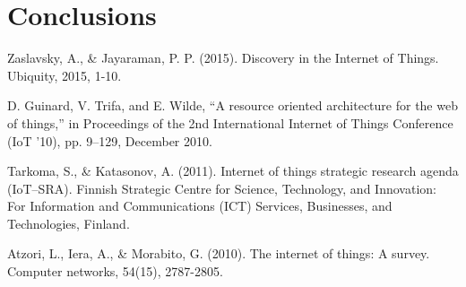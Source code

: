 \documentclass[conference]{IEEEtran}
\begin{document}
\section{Conclusions  }



\begin{thebibliography}{00}
	
	Zaslavsky, A., \& Jayaraman, P. P. (2015). Discovery in the Internet of Things. Ubiquity, 2015, 1-10.
	
 
 D. Guinard, V. Trifa, and E. Wilde, “A resource oriented architecture for the web of things,” in Proceedings of the 2nd International Internet of Things Conference (IoT ’10), pp. 9–129,
 December 2010.
 
 Tarkoma, S., \& Katasonov, A. (2011). Internet of things strategic research agenda (IoT–SRA). Finnish Strategic Centre for Science, Technology, and Innovation: For Information and Communications (ICT) Services, Businesses, and Technologies, Finland.
 
 Atzori, L., Iera, A., \& Morabito, G. (2010). The internet of things: A survey. Computer networks, 54(15), 2787-2805.
 

\end{thebibliography}
\end{document}
